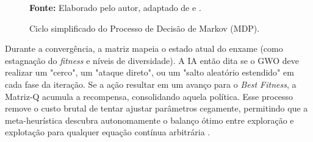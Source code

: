 \documentclass[12pt, a4paper, oneside]{report}
\begin{document}
\begin{figure}[htbp]
\centering
\caption{Ciclo simplificado do Processo de Decisão de Markov (MDP).}
\vspace{0.2cm}
\par\vspace{0.2cm}
\centerline{\small{\textbf{Fonte:} Elaborado pelo autor, adaptado de \citep{nayeem2025adaptive} e \citep{tu2024qlearning}.}}
\label{fig:ql_gwo_ciclo_simples}
\end{figure}

Durante a convergência, a matriz mapeia o estado atual do enxame (como estagnação do \textit{fitness} e níveis de diversidade). A IA então dita se o GWO deve realizar um "cerco", um "ataque direto", ou um "salto aleatório estendido" em cada fase da iteração. Se a ação resultar em um avanço para o \textit{Best Fitness}, a Matriz-Q acumula a recompensa, consolidando aquela política. Esse processo remove o custo brutal de tentar ajustar parâmetros cegamente, permitindo que a meta-heurística descubra autonomamente o balanço ótimo entre exploração e explotação para qualquer equação contínua arbitrária \citep{tu2024qlearning}.
\end{document}
